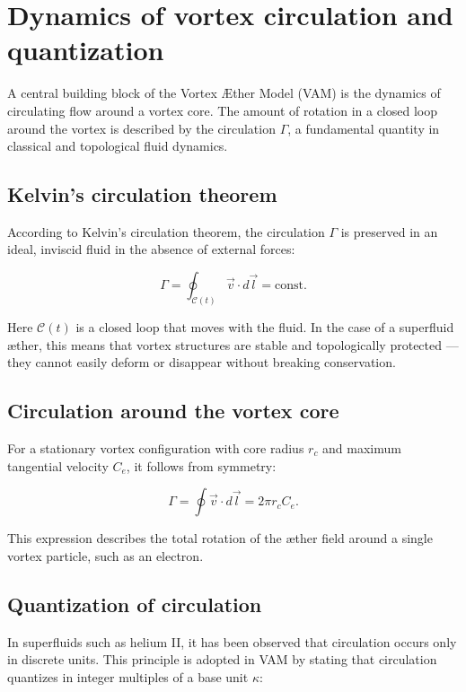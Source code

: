 \section{Dynamics of vortex circulation and quantization}\label{sec:appendix:4}

A central building block of the Vortex Æther Model (VAM) is the dynamics of circulating flow around a vortex core. The amount of rotation in a closed loop around the vortex is described by the circulation \( \Gamma \), a fundamental quantity in classical and topological fluid dynamics.

\subsection{Kelvin's circulation theorem}

According to Kelvin's circulation theorem, the circulation \( \Gamma \) is preserved in an ideal, inviscid fluid in the absence of external forces:

\begin{equation}
    \Gamma = \oint_{\mathcal{C}(t)} \vec{v} \cdot d\vec{l} = \text{const.}
\end{equation}

Here \( \mathcal{C}(t) \) is a closed loop that moves with the fluid. In the case of a superfluid æther, this means that vortex structures are stable and topologically protected — they cannot easily deform or disappear without breaking conservation.

\subsection{Circulation around the vortex core}

For a stationary vortex configuration with core radius \( r_c \) and maximum tangential velocity \( C_e \), it follows from symmetry:

\begin{equation}
    \Gamma = \oint \vec{v} \cdot d\vec{l} = 2\pi r_c C_e.
\end{equation}

This expression describes the total rotation of the æther field around a single vortex particle, such as an electron.

\subsection{Quantization of circulation}

In superfluids such as helium II, it has been observed that circulation occurs only in discrete units. This principle is adopted in VAM by stating that circulation quantizes in integer multiples of a base unit \( \kappa \):

